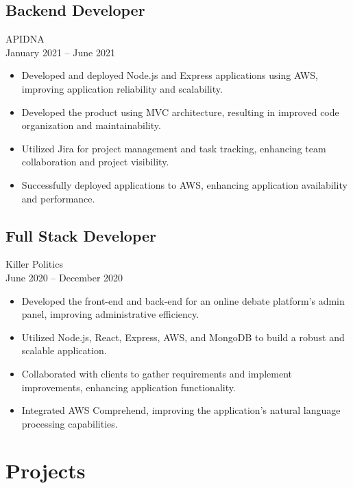 \documentclass[10pt, letterpaper]{article}
\begin{document}
        \subsection{Backend Developer}
            APIDNA \\
            January 2021 – June 2021
            \begin{itemize}[leftmargin=*]
                \item Developed and deployed Node.js and Express applications using AWS, improving application reliability and scalability.
                \item Developed the product using MVC architecture, resulting in improved code organization and maintainability.
                \item Utilized Jira for project management and task tracking, enhancing team collaboration and project visibility.
                \item Successfully deployed applications to AWS, enhancing application availability and performance.
            \end{itemize}
        \subsection{Full Stack Developer}
            Killer Politics \\
            June 2020 – December 2020
            \begin{itemize}[leftmargin=*]
                \item Developed the front-end and back-end for an online debate platform's admin panel, improving administrative efficiency.
                \item Utilized Node.js, React, Express, AWS, and MongoDB to build a robust and scalable application.
                \item Collaborated with clients to gather requirements and implement improvements, enhancing application functionality.
                \item Integrated AWS Comprehend, improving the application's natural language processing capabilities.
            \end{itemize}

    \section{Projects}
\end{document}
